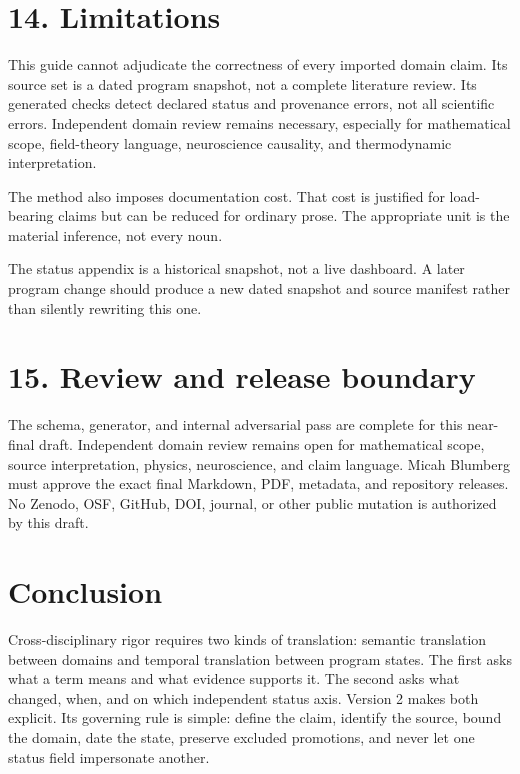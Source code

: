 \documentclass[
  american,
  11pt,
  letterpaper,
]{article}
\begin{document}
\section{14. Limitations}\label{limitations}

This guide cannot adjudicate the correctness of every imported domain claim. Its source set is a dated program snapshot, not a complete literature review. Its generated checks detect declared status and provenance errors, not all scientific errors. Independent domain review remains necessary, especially for mathematical scope, field-theory language, neuroscience causality, and thermodynamic interpretation.

The method also imposes documentation cost. That cost is justified for load-bearing claims but can be reduced for ordinary prose. The appropriate unit is the material inference, not every noun.

The status appendix is a historical snapshot, not a live dashboard. A later program change should produce a new dated snapshot and source manifest rather than silently rewriting this one.

\section{15. Review and release boundary}\label{review-and-release-boundary}

The schema, generator, and internal adversarial pass are complete for this near-final draft. Independent domain review remains open for mathematical scope, source interpretation, physics, neuroscience, and claim language. Micah Blumberg must approve the exact final Markdown, PDF, metadata, and repository releases. No Zenodo, OSF, GitHub, DOI, journal, or other public mutation is authorized by this draft.

\section{Conclusion}\label{conclusion}

Cross-disciplinary rigor requires two kinds of translation: semantic translation between domains and temporal translation between program states. The first asks what a term means and what evidence supports it. The second asks what changed, when, and on which independent status axis. Version 2 makes both explicit. Its governing rule is simple: define the claim, identify the source, bound the domain, date the state, preserve excluded promotions, and never let one status field impersonate another.
\end{document}
